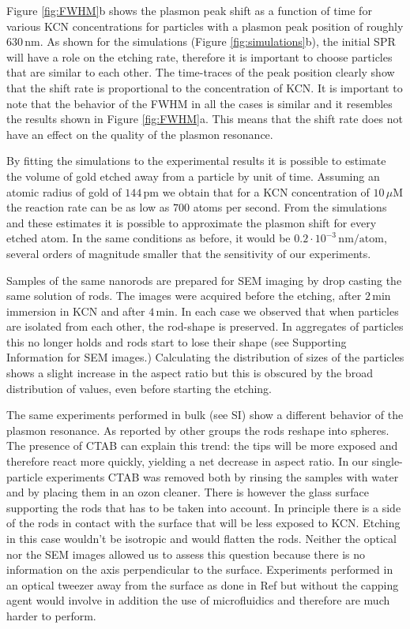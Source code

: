 \documentclass[a4paper,oneside,onecolumn]{article}
\newcommand{\nm}{\ensuremath{\,\textrm{nm}}}
\newcommand{\uM}{\ensuremath{\,\mu\textrm{M}}}
\begin{document}
Figure \ref{fig:FWHM}b shows the plasmon peak shift as a function of time for
various KCN concentrations for particles with a plasmon peak position of
roughly $630\nm$. As shown for the simulations (Figure
\ref{fig:simulations}b), the initial SPR will have a role on the etching rate,
therefore it is important to choose particles that are similar to each other.
The time-traces of the peak position clearly show that the shift rate is
proportional to the concentration of KCN. It is important to note that the
behavior of the FWHM in all the cases is similar and it resembles the results
shown in Figure \ref{fig:FWHM}a. This means that the shift rate does not have an
effect on the quality of the plasmon resonance.

By fitting the simulations to the experimental results it is possible to
estimate the volume of gold etched away from a particle by unit of time.
Assuming an atomic radius of gold of $144\,\textrm{pm}$\cite{Pauling1947} we
obtain that for a KCN concentration of $10\uM$ the reaction rate can be as low
as $700$ atoms per second. From the simulations and these estimates it is
possible to approximate the plasmon shift for every etched atom. In the same
conditions as before, it would be $0.2\cdot 10^{-3}\, \textrm{nm}/
\textrm{atom}$, several orders of magnitude smaller that the sensitivity
of our experiments.

Samples of the same nanorods are prepared for SEM imaging by drop casting the
same solution of rods. The images were acquired before the etching, after
$2\,\textrm{min}$ immersion in KCN and after $4\,\textrm{min}$. In each case we
observed that when particles are isolated from each other, the rod-shape is
preserved. In aggregates of particles this no longer holds and rods start to
lose their shape (see Supporting Information for SEM images.) Calculating the
distribution of sizes of the particles shows a slight increase in the aspect
ratio but this is obscured by the broad distribution of values, even before
starting the etching.

The same experiments performed in bulk (see SI) show a different behavior of
the plasmon resonance. As reported by other groups \cite{Jana2002}
\cite{Yuan2015} the rods reshape into spheres. The presence of CTAB can explain this trend: the tips will be more exposed and therefore react more quickly, yielding a net decrease in aspect ratio. In our single-particle
experiments CTAB was removed both by rinsing the samples with water and by placing them in an ozon cleaner. There is however the glass surface supporting the rods that has to be taken into account. In principle there is a side of the
rods in contact with the surface that will be less exposed to KCN. Etching
in this case wouldn't be isotropic and would flatten the rods. Neither the
optical nor the SEM images allowed us to assess this question because there is
no information on the axis perpendicular to the surface. Experiments performed
in an optical tweezer away from the surface as done in Ref \cite{Ni2012} but
without the capping agent would involve in addition the use of microfluidics and
therefore are much harder to perform.
\end{document}
